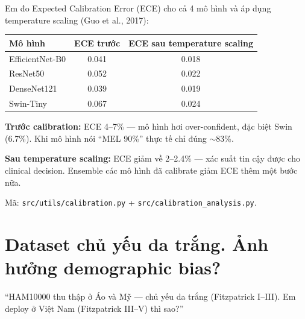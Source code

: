 \documentclass[11pt,a4paper]{article}
\begin{document}
\begin{answer}
Em đo Expected Calibration Error (ECE) cho cả 4 mô hình và áp dụng temperature scaling (Guo et al., 2017):

\begin{center}\small
\begin{tabular}{lcc}
\toprule
\textbf{Mô hình} & \textbf{ECE trước} & \textbf{ECE sau temperature scaling} \\
\midrule
EfficientNet-B0 & 0.041 & 0.018 \\
ResNet50        & 0.052 & 0.022 \\
DenseNet121     & 0.039 & 0.019 \\
Swin-Tiny       & 0.067 & 0.024 \\
\bottomrule
\end{tabular}
\end{center}

\textbf{Trước calibration:} ECE 4--7\% --- mô hình hơi over-confident, đặc biệt Swin (6.7\%). Khi mô hình nói ``MEL 90\%'' thực tế chỉ đúng $\sim$83\%.

\textbf{Sau temperature scaling:} ECE giảm về 2--2.4\% --- xác suất tin cậy được cho clinical decision. Ensemble các mô hình đã calibrate giảm ECE thêm một bước nữa.

Mã: \texttt{src/utils/calibration.py} + \texttt{src/calibration\_analysis.py}.
\end{answer}

\section{Dataset chủ yếu da trắng. Ảnh hưởng demographic bias?}

\begin{question}
``HAM10000 thu thập ở Áo và Mỹ --- chủ yếu da trắng (Fitzpatrick I--III). Em deploy ở Việt Nam (Fitzpatrick III--V) thì sao?''
\end{question}
\end{document}
